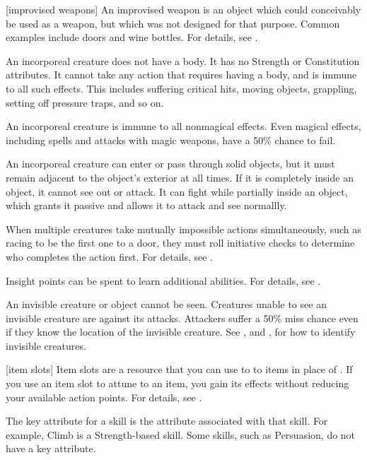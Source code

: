 [improvised weapons] An improvised weapon is an object which could conceivably be used as a weapon, but which was not designed for that purpose.
Common examples include doors and wine bottles.
For details, see .

 An incorporeal creature does not have a body.
It has no Strength or Constitution attributes.
It cannot take any action that requires having a body, and is immune to all such effects.
This includes suffering critical hits, moving objects, grappling, setting off pressure traps, and so on.

An incorporeal creature is immune to all nonmagical effects.
Even magical effects, including spells and attacks with magic weapons, have a 50\% chance to fail.

An incorporeal creature can enter or pass through solid objects, but it must remain adjacent to the object's exterior at all times.
If it is completely inside an object, it cannot see out or attack.
It can fight while partially inside an object, which grants it passive  and allows it to attack and see normallly.

 When multiple creatures take mutually impossible actions simultaneously, such as racing to be the first one to a door, they must roll initiative checks to determine who completes the action first.
For details, see .

 Insight points can be spent to learn additional abilities.
For details, see .

 An invisible creature or object cannot be seen. Creatures unable to see an invisible creature are  against its attacks. Attackers suffer a 50\% miss chance even if they know the location of the invisible creature. See , and , for how to identify invisible creatures.

[item slots] Item slots are a resource that you can use to  to items in place of .
If you use an item slot to attune to an item, you gain its effects without reducing your available action points.
For details, see .

 The key attribute for a skill is the attribute associated with that skill.
For example, Climb is a Strength-based skill.
Some skills, such as Persuasion, do not have a key attribute.

